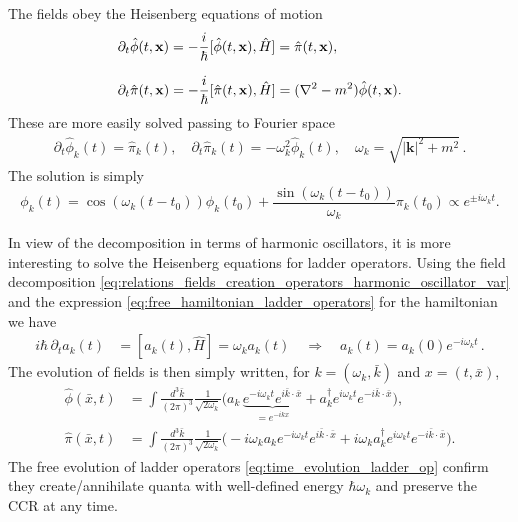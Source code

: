 \documentclass[../QFT_main.tex]{subfiles}
\begin{document}
\begin{mytheorem}
%
The fields obey the Heisenberg equations of motion
\begin{align}
    &\partial_t\hat{\phi}(t, \mathbf{x}) = -\frac{i}{\hbar}[\hat{\phi}(t, \mathbf{x}), \hat{H}] = \hat{\pi}(t, \mathbf{x}), \\[7pt]
    \displaystyle
    &\partial_t\hat{\pi}(t, \mathbf{x}) = -\frac{i}{\hbar} [\hat{\pi}(t, \mathbf{x}), \hat{H}] = (\nabla^2 - m^2) \hat{\phi}(t, \mathbf{x}).
\end{align}
These are more easily solved passing to Fourier space 
\begin{align}
    \partial_t \hat{\phi}_k(t) = \hat{\pi}_k(t), \quad
    \partial_t \hat{\pi}_k(t) = -\omega_k^2 \hat{\phi}_k(t), \quad \omega_k = \sqrt{|\mathbf{k}|^2 + m^2}\,.
\end{align}
The solution is simply
\begin{equation}
    \phi_k(t) = \cos(\omega_k (t-t_0)) \phi_k(t_0) + \frac{\sin(\omega_k (t-t_0))}{\omega_k} \pi_k(t_0) \propto e^{\pm i \omega_k t}.
\end{equation}

In view of the decomposition in terms of harmonic oscillators, it is more interesting to solve the Heisenberg equations for ladder operators.
Using the field decomposition \eqref{eq:relations_fields_creation_operators_harmonic_oscillator_var} and the expression \eqref{eq:free_hamiltonian_ladder_operators} for the hamiltonian we have
\begin{align}\label{eq:time_evolution_ladder_op}
    i\hbar\,\partial_t a_k(t) &= [a_k(t), \hat{H}] = \omega_k a_k(t) \quad \Rightarrow \quad a_k(t) = a_k(0) e^{-i \omega_k t}\,.
\end{align}
The evolution of fields is then simply written, for $k=(\omega_k, \bar{k})$ and $x=(t, \bar{x})$,
\begin{align}\label{eq:time_evolution_free_field}
    \hat{\phi}(\bar{x},t) &
    = \int \frac{d^3{\bar{k}}}{(2\pi)^3} \frac{1}{\sqrt{2\omega_k}} \Big( a_k \,\underbrace{e^{-i \omega_k t} e^{i {\bar{k}}\cdot{\bar{x}}}}_{=e^{-ikx}} + a_k^{\dagger} e^{i \omega_k t} e^{- i {\bar{k}}\cdot{\bar{x}}} \Big),
    \\
    \hat{\pi}(\bar{x},t) &
    = \int \frac{d^3{\bar{k}}}{(2\pi)^3} \frac{1}{\sqrt{2\omega_k}} \Big( -i \omega_k a_k e^{-i \omega_k t} e^{i {\bar{k}}\cdot{\bar{x}}} + i \omega_k a_k^{\dagger} e^{i \omega_k t} e^{- i {\bar{k}}\cdot{\bar{x}}} \Big).
\end{align}
The free evolution of ladder operators \eqref{eq:time_evolution_ladder_op} confirm they create/annihilate quanta with well-defined energy $\hbar \omega_k$ and preserve the CCR at any time.


\end{mytheorem}
\end{document}
